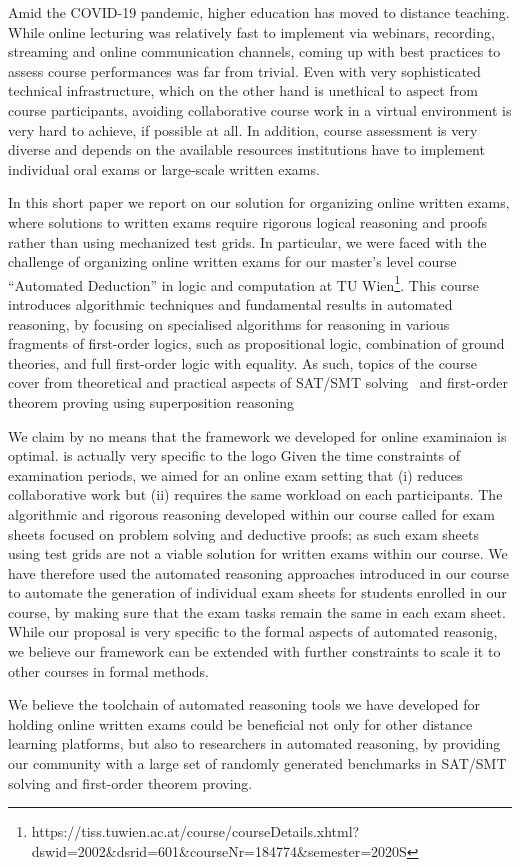 Amid the COVID-19 pandemic, higher education has moved to distance
teaching. While online lecturing was relatively fast to implement via
webinars, recording,  streaming and online communication channels,
coming up with best practices to assess course performances was far
from trivial. Even with very sophisticated technical infrastructure,
which on the other hand is unethical to aspect from course
participants,  avoiding collaborative course work in a virtual
environment is very hard to achieve, if possible at all.
In addition, course assessment is very diverse and depends on the
available resources institutions have to implement individual oral
exams or large-scale written exams.

In this short paper we report on our solution for organizing online
written exams, where solutions to written exams require rigorous
logical reasoning and proofs rather than using mechanized test grids.
In particular, we were faced with the challenge of organizing online
written exams for our master's level course ``Automated
Deduction'' in logic and computation at TU
Wien\footnote{https://tiss.tuwien.ac.at/course/courseDetails.xhtml?dswid=2002\&dsrid=601\&courseNr=184774\&semester=2020S}.
This course introduces algorithmic techniques and fundamental results
in automated reasoning, by focusing on specialised algorithms for
reasoning in various fragments of first-order logics, such as
propositional logic, combination of ground theories, and full
first-order logic with equality.
As such, topics of the course cover from theoretical and practical
aspects of SAT/SMT solving~\cite{DPLLTinelli,NelsonOppen} and first-order theorem proving using
superposition reasoning~\cite{Ganzinger02,Rubio02,Vampire13}

We claim by no means that the framework we developed for online
examinaion is optimal.
is actually very specific to the logo
Given the time constraints of examination periods, we aimed for an
online exam setting that (i) reduces collaborative work but (ii)
requires the same workload on each participants.
The algorithmic and rigorous reasoning developed within our
course called for exam sheets focused on problem solving and deductive
proofs; as such exam sheets using test grids are not a viable solution
for written exams within our course.
We have therefore used the automated reasoning approaches introduced in our
course to automate the generation of individual exam sheets for
students enrolled in our course, by making sure that the exam tasks
remain the same in each exam sheet. 
While our proposal is very specific to the formal aspects of automated
reasonig, we believe our framework can be extended with further
constraints to scale it to other courses in formal methods. 


We believe the toolchain of automated reasoning tools we have developed for
holding online written exams could be beneficial not only for other
distance learning platforms, but also to researchers in automated
reasoning, by providing our community with a large set of randomly generated benchmarks in SAT/SMT solving and first-order theorem proving.


